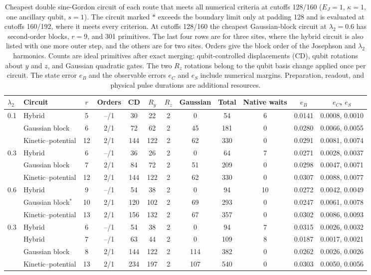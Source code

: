 \documentclass[pra,twocolumn,superscriptaddress,nofootinbib,floatfix]{revtex4-2}
\theoremstyle{remark}
\begin{document}
\begin{table}[t]
\caption{Cheapest double sine-Gordon circuit of each route that meets all numerical criteria at cutoffs 128/160 (\(E_J=1\), \(\kappa=1\), one ancillary qubit, \(s=1\)). The circuit marked \(\ast\) exceeds the boundary limit only at padding 128 and is evaluated at cutoffs 160/192, where it meets every criterion. At cutoffs 128/160 the cheapest Gaussian-block circuit at \(\lambda_2=0.6\) has second-order blocks, \(r=9\), and 301 primitives. The last four rows are for three sites, where the hybrid circuit is also listed with one more outer step, and the others are for two sites. Orders give the block order of the Josephson and \(\lambda_2\) harmonics. Counts are ideal primitives after exact merging: qubit-controlled displacements (CD), qubit rotations about \(y\) and \(z\), and Gaussian quadratic gates. The two \(R_z\) rotations belong to the qubit basis change applied once per circuit. The state error \(e_B\) and the observable errors \(e_C\) and \(e_S\) include numerical margins. Preparation, readout, and physical pulse durations are additional resources.}
\label{tab:dsg-resources}
\begin{ruledtabular}
\begin{tabular}{llcccccccccc}
\(\lambda_2\) & Circuit & \(r\) & Orders & CD & \(R_y\) & \(R_z\) & Gaussian & Total & Native waits & \(e_B\) & \(e_C\), \(e_S\) \\
\hline
0.1 & Hybrid & 5 & --/1 & 30 & 22 & 2 & 0 & 54 & 6 & 0.0141 & 0.0008, 0.0010 \\
  & Gaussian block & 6 & 2/1 & 72 & 62 & 2 & 45 & 181 & 0 & 0.0280 & 0.0066, 0.0055 \\
  & Kinetic--potential & 12 & 2/1 & 144 & 122 & 2 & 62 & 330 & 0 & 0.0291 & 0.0081, 0.0074 \\
0.3 & Hybrid & 6 & --/1 & 36 & 26 & 2 & 0 & 64 & 7 & 0.0271 & 0.0028, 0.0037 \\
  & Gaussian block & 7 & 2/1 & 84 & 72 & 2 & 51 & 209 & 0 & 0.0298 & 0.0047, 0.0071 \\
  & Kinetic--potential & 12 & 2/1 & 144 & 122 & 2 & 62 & 330 & 0 & 0.0307 & 0.0088, 0.0077 \\
0.6 & Hybrid & 9 & --/1 & 54 & 38 & 2 & 0 & 94 & 10 & 0.0272 & 0.0042, 0.0049 \\
  & Gaussian block\(^\ast\) & 10 & 2/1 & 120 & 102 & 2 & 69 & 293 & 0 & 0.0247 & 0.0061, 0.0078 \\
  & Kinetic--potential & 13 & 2/1 & 156 & 132 & 2 & 67 & 357 & 0 & 0.0302 & 0.0086, 0.0093 \\
\hline
0.3 & Hybrid & 6 & --/1 & 54 & 38 & 2 & 0 & 94 & 7 & 0.0315 & 0.0026, 0.0032 \\
  & Hybrid & 7 & --/1 & 63 & 44 & 2 & 0 & 109 & 8 & 0.0187 & 0.0017, 0.0021 \\
  & Gaussian block & 8 & 2/1 & 144 & 122 & 2 & 114 & 382 & 0 & 0.0262 & 0.0026, 0.0026 \\
  & Kinetic--potential & 13 & 2/1 & 234 & 197 & 2 & 107 & 540 & 0 & 0.0303 & 0.0050, 0.0056 \\
\end{tabular}
\end{ruledtabular}
\end{table}
\end{document}
